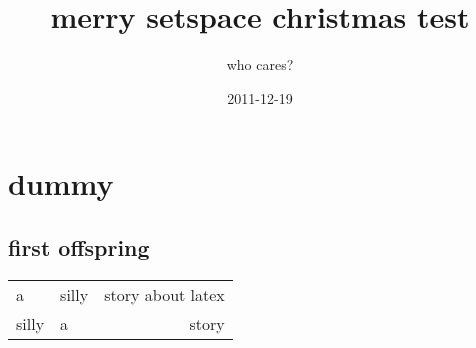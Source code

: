 \documentclass{article}
\begin{document}
\title{merry setspace christmas test}
\author{who cares?}
\date{2011-12-19}
\maketitle

\section{dummy}
\lipsum[1]
\subsection{first offspring}
\lipsum[2]
\begin{tabular}{llr}
  a & silly & story about latex \\
  silly & a & story
\end{tabular}
\end{document}
